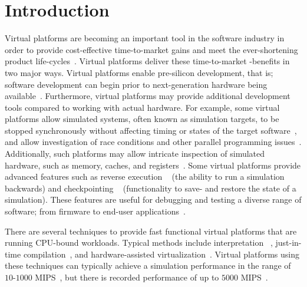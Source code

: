 
\section{Introduction}
\label{sec:introduction}
Virtual platforms are becoming an important tool in the software industry in order to provide cost-effective time-to-market gains and meet the ever-shortening product life-cycles~.
Virtual platforms deliver these time-to-market -benefits in two major ways.
Virtual platforms enable pre-silicon development, that is; software development can begin prior to next-generation hardware being available~.
Furthermore, virtual platforms may provide additional development tools compared to working with actual hardware.
For example, some virtual platforms allow simulated systems, often known as simulation targets, to be stopped synchronously without affecting timing or states of the target software~, and allow investigation of race conditions and other parallel programming issues~.
Additionally, such platforms may allow intricate inspection of simulated hardware, such as memory, caches, and registers~.
Some virtual platforms provide advanced features such as reverse execution ~ (the ability to run a simulation backwards) and checkpointing ~ (functionality to save- and restore the state of a simulation).
These features are useful for debugging and testing a diverse range of software; from firmware to end-user applications~.

There are several techniques to provide fast functional virtual platforms that are running CPU-bound workloads.
Typical methods include interpretation ~, just-in-time compilation~, and hardware-assisted virtualization~.
Virtual platforms using these techniques can typically achieve a simulation performance in the range of $10$-$1000$ MIPS~, but there is recorded performance of up to $5000$ MIPS~.


